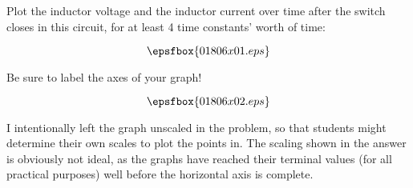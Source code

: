 

Plot the inductor voltage and the inductor current over time after the switch closes in this circuit, for at least 4 time constants' worth of time:

$$\epsfbox{01806x01.eps}$$

Be sure to label the axes of your graph!







$$\epsfbox{01806x02.eps}$$







I intentionally left the graph unscaled in the problem, so that students might determine their own scales to plot the points in.  The scaling shown in the answer is obviously not ideal, as the graphs have reached their terminal values (for all practical purposes) well before the horizontal axis is complete.




